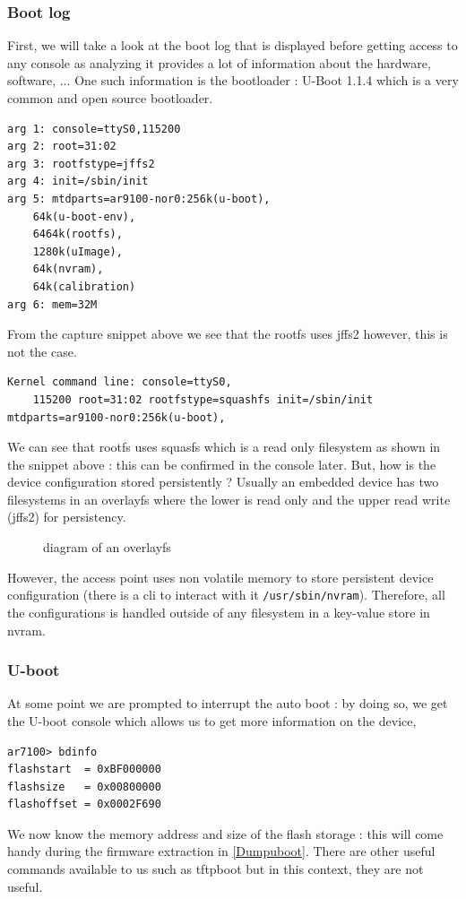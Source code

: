 \documentclass{article}
\begin{document}
\subsubsection{Boot log}
First, we will take a look at the boot log that is displayed before getting access to any console as analyzing it provides a lot of information about the hardware, software, ... One such information is the bootloader : U-Boot 1.1.4 which is a very common and open source bootloader. 
\begin{lstlisting}
arg 1: console=ttyS0,115200
arg 2: root=31:02
arg 3: rootfstype=jffs2
arg 4: init=/sbin/init
arg 5: mtdparts=ar9100-nor0:256k(u-boot),
	64k(u-boot-env),
	6464k(rootfs),
	1280k(uImage),
	64k(nvram),
	64k(calibration)
arg 6: mem=32M
\end{lstlisting}
From the capture snippet above we see that the rootfs uses jffs2 however, this is not the case.
\begin{lstlisting}
Kernel command line: console=ttyS0,
	115200 root=31:02 rootfstype=squashfs init=/sbin/init mtdparts=ar9100-nor0:256k(u-boot),
\end{lstlisting}
We can see that rootfs uses squasfs which is a read only filesystem as shown in the snippet above : this can be confirmed in the console later. But, how is the device configuration stored persistently ? Usually an embedded device has two filesystems in an overlayfs where the lower is read only and the upper read write (jffs2) for persistency.
\begin{figure}[!ht]
	\centering
		
	\caption{diagram of an overlayfs}
\end{figure} 

\noindent However, the access point uses non volatile memory to store persistent device configuration (there is a cli to interact with it \lstinline{/usr/sbin/nvram}). Therefore, all the configurations is handled outside of any filesystem in a key-value store in nvram.
\subsubsection{U-boot}\label{ubootinfo}
At some point we are prompted to interrupt the auto boot : by doing so, we get the U-boot console which allows us to get more information on the device,
\begin{lstlisting}
ar7100> bdinfo
flashstart  = 0xBF000000
flashsize   = 0x00800000
flashoffset = 0x0002F690
\end{lstlisting}
We now know the memory address and size of the flash storage : this will come handy during the firmware extraction in \ref{Dumpuboot}. There are other useful commands available to us such as tftpboot but in this context, they are not useful.
\end{document}
